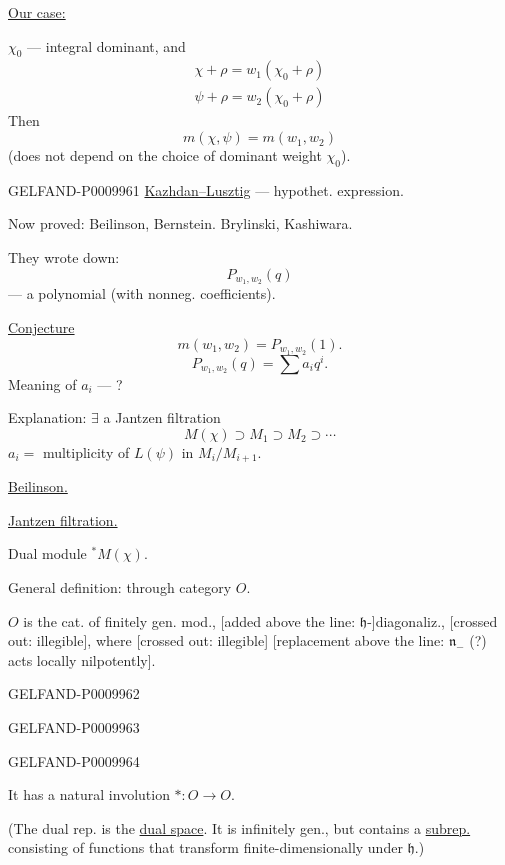 \underline{Our case:}

$\chi_0$ --- integral dominant, and
\begin{gather*}
\chi+\rho=w_1(\chi_0+\rho)\\
\psi+\rho=w_2(\chi_0+\rho)
\end{gather*}
Then
\[
m(\chi,\psi)=m(w_1,w_2)
\]
(does not depend on the choice of dominant weight $\chi_0$).


\begin{GelfandAdjacentEvidence}{GELFAND-P000996}{1}
\underline{Kazhdan--Lusztig} --- hypothet. expression.

Now proved: Beilinson, Bernstein. Brylinski, Kashiwara.

They wrote down:
\[
P_{w_1,w_2}(q)
\]
--- a polynomial (with nonneg. coefficients).

\underline{Conjecture}
\[
m(w_1,w_2)=P_{w_1,w_2}(1).
\]
\[
P_{w_1,w_2}(q)=\sum a_iq^i.
\]
Meaning of $a_i$ --- ?

Explanation: $\exists$ a Jantzen filtration
\[
M(\chi)\supset M_1\supset M_2\supset\cdots
\]
$a_i={}$ multiplicity of $L(\psi)$ in $M_i/M_{i+1}$.

\underline{Beilinson.}

\underline{Jantzen filtration.}

Dual module \({}^*M(\chi)\).

General definition: through category $O$.

$O$ is the cat. of finitely gen. mod., [added above the line: $\mathfrak h$-]diagonaliz., [crossed out: illegible], where [crossed out: illegible] [replacement above the line: $\mathfrak n_-$ (?) acts locally nilpotently].
\end{GelfandAdjacentEvidence}
\begin{GelfandAdjacentEvidence}{GELFAND-P000996}{2}

\end{GelfandAdjacentEvidence}
\begin{GelfandAdjacentEvidence}{GELFAND-P000996}{3}

\end{GelfandAdjacentEvidence}
\begin{GelfandAdjacentEvidence}{GELFAND-P000996}{4}


It has a natural involution $*:O\longrightarrow O$.

(The dual rep. is the \underline{dual space}. It is infinitely gen., but contains a \underline{subrep.} consisting of functions that transform finite-dimensionally under $\mathfrak h$.)
\end{GelfandAdjacentEvidence}
